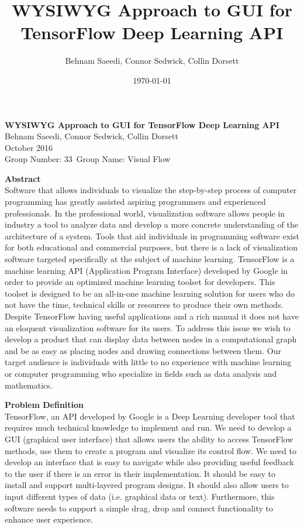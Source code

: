 \documentclass[a4paper,10pt]{IEEEtran} \usepackage[margin=1.0in]{geometry} \usepackage{pdfpages} \usepackage{graphicx}
\title{WYSIWYG Approach to GUI for TensorFlow Deep Learning API}
\author{Behnam Saeedi, Connor Sedwick, Collin Dorsett}
\date{\today}
\newcommand*\Title{WYSIWYG Approach to GUI for TensorFlow Deep Learning API}
\newcommand*\Date{October 2016}
\newcommand*\Author{Behnam Saeedi, Connor Sedwick, Collin Dorsett}
\newcommand*\GroupNumber{Group Number: 33}
\newcommand*\GroupName{Group Name: Visual Flow}
\begin{document}
	\begin{titlepage}
%	
		\vspace*{\fill}
			\begin{center}
				\noindent \textbf{\Huge\Title} \\ 
				\large\Author \\ 
				\large\Date \\ 
				\large\GroupNumber \, \large\GroupName 
			\end{center}
			\noindent \textbf{Abstract} \\
			\indent 
			Software that allows individuals to visualize the step-by-step process of computer programming has greatly assisted aspiring programmers and experienced professionals.
	In the professional world, visualization software allows people in industry a tool to analyze data and develop a more concrete understanding of the architecture of a system. 
	Tools that aid individuals in programming software exist for both educational and commercial purposes, but there is a lack of visualization software targeted specifically at the subject of machine learning.
			TensorFlow is a machine learning API (Application Program Interface) developed by Google in order to provide an optimized machine learning toolset for developers.
			 This toolset is designed to be an all-in-one machine learning solution for users who do not have the time, technical skills or resources to produce their own methods.
			 Despite TensorFlow having useful applications and a rich manual it does not have an eloquent visualization software for its users.
			 To address this issue we wish to develop a product that can display data between nodes in a computational graph and be as easy as placing nodes and drawing connections between them. Our target audience is individuals with little to no experience with machine learning or computer programming who specialize in fields such as data analysis and mathematics.\\
		\vspace*{\fill}
	\end{titlepage}

	\noindent \textbf{Problem Definition}\\
	\indent TensorFlow, an API developed by Google is a Deep Learning developer tool that requires much technical knowledge to implement and run.
	 We need to develop a GUI (graphical user interface) that allows users the ability to access TensorFlow methods, use them to create a program and visualize its control flow.
	 We need to develop an interface that is easy to navigate while also providing useful feedback to the user if there is an error in their implementation.
	 It should be easy to install and support multi-layered program designs. It should also allow users to input different types of data (i.e. graphical data or text).
	 Furthermore, this software needs to support a simple drag, drop and connect functionality to enhance user experience.\\
\end{document}
